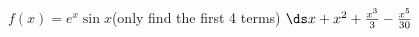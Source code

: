 {$f(x) = e^x\sin x$\quad (only find the first 4 terms)
}
{$\ds x+x^2+\frac{x^3}{3}-\frac{x^5}{30}$
}